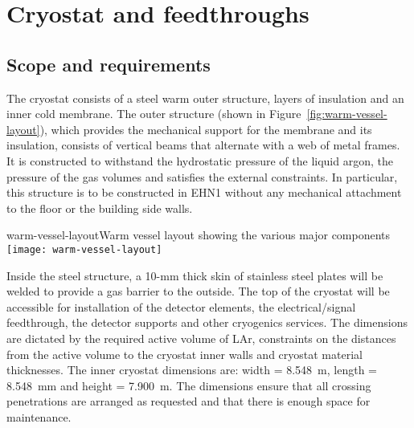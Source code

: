 
\section{Cryostat and feedthroughs}

\subsection{Scope and requirements}

The cryostat consists of a steel warm outer structure, layers of insulation and an inner cold membrane.  The outer %
structure (shown in Figure~\ref{fig:warm-vessel-layout}), which provides %
the mechanical support for the  %
membrane and its insulation,  consists of vertical beams that alternate with a web of metal frames. It is constructed to %
withstand the hydrostatic pressure of the liquid argon, the pressure of the gas volumes and %
satisfies the external constraints. %
In particular, this structure is to be constructed in EHN1 without any mechanical attachment to the floor or the building side walls.  
%
\begin{cdrfigure}{warm-vessel-layout}{Warm vessel layout showing the various major components}
  \texttt{[image: warm-vessel-layout]}
\end{cdrfigure}
Inside the steel structure, a 10-mm thick skin of stainless steel plates will be welded to provide a gas barrier to the outside.
The top of the cryostat will be accessible for installation of the detector elements, the electrical/signal feedthrough, the detector supports and other cryogenics services.  The dimensions %
are dictated by the required %
active volume of LAr, constraints on the distances from the active volume to the cryostat inner walls and cryostat material thicknesses.  %
The inner cryostat dimensions are: width = 8.548~m, length = 8.548~mm and height = 7.900~m. The dimensions 
ensure that all crossing penetrations are arranged as requested and that there is enough space for maintenance. 


